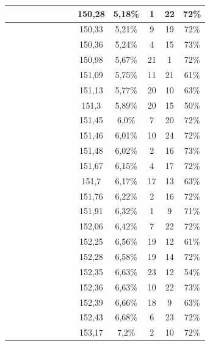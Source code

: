 \begin{center}
\begin{longtable}{|c|c|c|c|c|c|c|c|c|c|c|c|c|}
 \x &  &  \x &  &  \x &  \x &  \x &  \x & 150,28 & 5,18\% & 1 & 22 & 72\% \\ \hline
 \x &  \x &  \x &  \x &  &  \x &  &  \x & 150,33 & 5,21\% & 9 & 19 & 72\% \\ \hline
 \x &  \x &  &  &  &  \x &  \x &  \x & 150,36 & 5,24\% & 4 & 15 & 73\% \\ \hline
 \x &  \x &  &  &  &  \x &  &  \x & 150,98 & 5,67\% & 21 & 1 & 72\% \\ \hline
 \x &  &  &  &  \x &  &  &  \x & 151,09 & 5,75\% & 11 & 21 & 61\% \\ \hline
 \x &  &  \x &  \x &  &  &  &  \x & 151,13 & 5,77\% & 20 & 10 & 63\% \\ \hline
 \x &  &  &  \x &  &  &  &  \x & 151,3 & 5,89\% & 20 & 15 & 50\% \\ \hline
 \x &  \x &  &  \x &  &  \x &  &  \x & 151,45 & 6,0\% & 7 & 20 & 72\% \\ \hline
 \x &  \x &  \x &  \x &  \x &  \x &  &  \x & 151,46 & 6,01\% & 10 & 24 & 72\% \\ \hline
 \x &  \x &  &  &  \x &  \x &  \x &  \x & 151,48 & 6,02\% & 2 & 16 & 73\% \\ \hline
 \x &  \x &  &  \x &  \x &  \x &  \x &  \x & 151,67 & 6,15\% & 4 & 17 & 72\% \\ \hline
 \x &  &  \x &  \x &  &  &  &  \x & 151,7 & 6,17\% & 17 & 13 & 63\% \\ \hline
 \x &  &  \x &  \x &  \x &  \x &  \x &  \x & 151,76 & 6,22\% & 2 & 16 & 72\% \\ \hline
 \x &  &  \x &  \x &  \x &  \x &  &  \x & 151,91 & 6,32\% & 1 & 9 & 71\% \\ \hline
 \x &  &  \x &  \x &  &  \x &  \x &  \x & 152,06 & 6,42\% & 7 & 22 & 72\% \\ \hline
 \x &  \x &  &  &  \x &  &  &  \x & 152,25 & 6,56\% & 19 & 12 & 61\% \\ \hline
 \x &  &  &  &  \x &  \x &  &  \x & 152,28 & 6,58\% & 19 & 14 & 72\% \\ \hline
 \x &  \x &  &  \x &  &  &  &  \x & 152,35 & 6,63\% & 23 & 12 & 54\% \\ \hline
 \x &  \x &  &  &  &  \x &  \x &  \x & 152,36 & 6,63\% & 10 & 22 & 73\% \\ \hline
 \x &  \x &  \x &  \x &  \x &  &  \x &  \x & 152,39 & 6,66\% & 18 & 9 & 63\% \\ \hline
 \x &  &  &  \x &  \x &  \x &  &  \x & 152,43 & 6,68\% & 6 & 23 & 72\% \\ \hline
 \x &  \x &  &  &  \x &  \x &  &  \x & 153,17 & 7,2\% & 2 & 10 & 72\% \\ \hline

\end{longtable}
\end{center}
